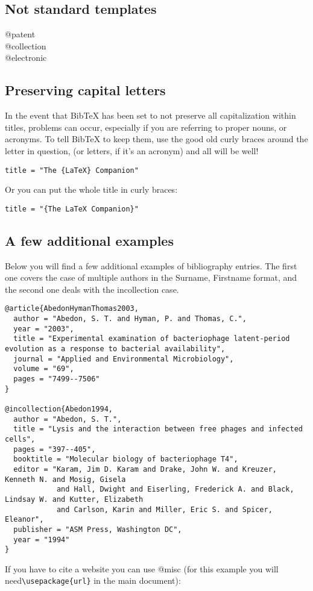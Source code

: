 \subsection{Not standard templates}
\begin{description}
\item[@patent]
\item[@collection]
\item[@electronic]
\end{description}

\subsection{Preserving capital letters}
In the event that BibTeX has been set to not preserve all capitalization within
titles, problems can occur, especially if you are referring to proper nouns, or
acronyms. To tell BibTeX to keep them, use the good old curly braces around the
letter in question, (or letters, if it's an acronym) and all will be well!

\begin{verbatim}title = "The {LaTeX} Companion"\end{verbatim}

Or you can put the whole title in curly braces:

\begin{verbatim}title = "{The LaTeX Companion}"\end{verbatim}

\subsection{A few additional examples}
Below you will find a few additional examples of bibliography entries. The
first one covers the case of multiple authors in the Surname, Firstname format,
and the second one deals with the incollection case.

\begin{lstlisting}
@article{AbedonHymanThomas2003,
  author = "Abedon, S. T. and Hyman, P. and Thomas, C.",
  year = "2003",
  title = "Experimental examination of bacteriophage latent-period evolution as a response to bacterial availability",
  journal = "Applied and Environmental Microbiology",
  volume = "69",
  pages = "7499--7506"
}

@incollection{Abedon1994,
  author = "Abedon, S. T.",
  title = "Lysis and the interaction between free phages and infected cells",
  pages = "397--405",
  booktitle = "Molecular biology of bacteriophage T4",
  editor = "Karam, Jim D. Karam and Drake, John W. and Kreuzer, Kenneth N. and Mosig, Gisela
            and Hall, Dwight and Eiserling, Frederick A. and Black, Lindsay W. and Kutter, Elizabeth
            and Carlson, Karin and Miller, Eric S. and Spicer, Eleanor",
  publisher = "ASM Press, Washington DC",
  year = "1994"
}
\end{lstlisting}
If you have to cite a website you can use @misc (for this example you will
need\verb|\usepackage{url}| in the main document):

